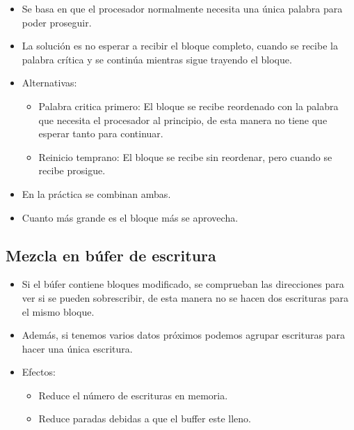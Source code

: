 \documentclass[12pt, twoside, openright]{report} %
\begin{document}
    \begin{itemize}
    
    \item
      Se basa en que el procesador normalmente necesita una única
      palabra para poder proseguir.
    \item
      La solución es no esperar a recibir el bloque completo, cuando se
      recibe la palabra crítica y se continúa mientras sigue trayendo el
      bloque.
    \item
      Alternativas:

      \begin{itemize}
      
      \item
        Palabra critica primero: El bloque se recibe reordenado con la
        palabra que necesita el procesador al principio, de esta manera
        no tiene que esperar tanto para continuar.
      \item
        Reinicio temprano: El bloque se recibe sin reordenar, pero
        cuando se recibe prosigue.
      \end{itemize}
    \item
      En la práctica se combinan ambas.
    \item
      Cuanto más grande es el bloque más se aprovecha.
    \end{itemize}
  \subsection{Mezcla en búfer de escritura}

    \begin{itemize}
    
    \item
      Si el búfer contiene bloques modificado, se comprueban las
      direcciones para ver si se pueden sobrescribir, de esta manera no
      se hacen dos escrituras para el mismo bloque.
    \item
      Además, si tenemos varios datos próximos podemos agrupar
      escrituras para hacer una única escritura.
    \item
      Efectos:

      \begin{itemize}
      
      \item
        Reduce el número de escrituras en memoria.
      \item
        Reduce paradas debidas a que el buffer este lleno.
      \end{itemize}
    \end{itemize}
\end{document}
